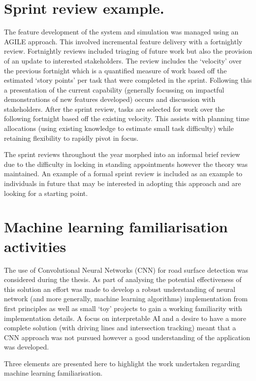 \documentclass{article}
\begin{document}
\section{Sprint review example.}

The feature development of the system and simulation was managed using an AGILE approach. This involved incremental feature delivery with a fortnightly review. Fortnightly reviews included triaging of future work but also the provision of an update to interested stakeholders. The review includes the `velocity' over the previous fortnight which is a quantified measure of work based off the estimated `story points' per task that were completed in the sprint. Following this a presentation of the current capability (generally focussing on impactful demonstrations of new features developed) occurs and discussion with stakeholders. After the sprint review, tasks are selected for work over the following fortnight based off the existing velocity. This assists with planning time allocations (using existing knowledge to estimate small task difficulty) while retaining flexibility to rapidly pivot in focus.

The sprint reviews throughout the year morphed into an informal brief review due to the difficulty in locking in standing appointments however the theory was maintained. An example of a formal sprint review is included as an example to individuals in future that may be interested in adopting this approach and are looking for a starting point.

\section{Machine learning familiarisation activities}

The use of Convolutional Neural Networks (CNN) for road surface detection was considered during the thesis. As part of analysing the potential effectiveness of this solution an effort was made to develop a robust understanding of neural network (and more generally, machine learning algorithms) implementation from first principles as well as small `toy' projects to gain a working familiarity with implementation details. A focus on interpretable AI and a desire to have a more complete solution (with driving lines and intersection tracking) meant that a CNN approach was not pursued however a good understanding of the application was developed.

Three elements are presented here to highlight the work undertaken regarding machine learning familiarisation.
\end{document}
